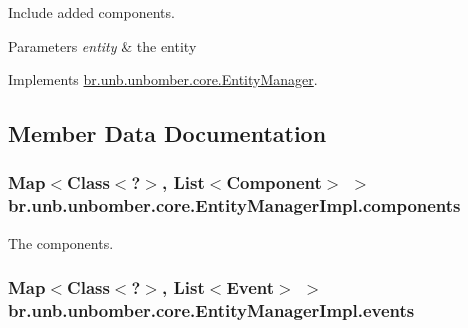 Include added components. 


\begin{DoxyParams}{Parameters}
{\em entity} & the entity \\
\hline
\end{DoxyParams}


Implements \hyperlink{interfacebr_1_1unb_1_1unbomber_1_1core_1_1_entity_manager_a2843eea2e05f790f2d6be258bf00da9e}{br.\+unb.\+unbomber.\+core.\+Entity\+Manager}.



\subsection{Member Data Documentation}
\hypertarget{classbr_1_1unb_1_1unbomber_1_1core_1_1_entity_manager_impl_aeb1f73aabc5b9a3b2e4728cc5105152c}{
\subsubsection[{components}]{\setlength{\rightskip}{0pt plus 5cm}Map$<$Class$<$?$>$, List$<${\bf Component}$>$ $>$ br.\+unb.\+unbomber.\+core.\+Entity\+Manager\+Impl.\+components\hspace{0.3cm}{\ttfamily [private]}}}\label{classbr_1_1unb_1_1unbomber_1_1core_1_1_entity_manager_impl_aeb1f73aabc5b9a3b2e4728cc5105152c}


The components. 

\hypertarget{classbr_1_1unb_1_1unbomber_1_1core_1_1_entity_manager_impl_abc12602c37518ce23d253360215b077f}{
\subsubsection[{events}]{\setlength{\rightskip}{0pt plus 5cm}Map$<$Class$<$?$>$, List$<${\bf Event}$>$ $>$ br.\+unb.\+unbomber.\+core.\+Entity\+Manager\+Impl.\+events\hspace{0.3cm}{\ttfamily [private]}}}\label{classbr_1_1unb_1_1unbomber_1_1core_1_1_entity_manager_impl_abc12602c37518ce23d253360215b077f}



